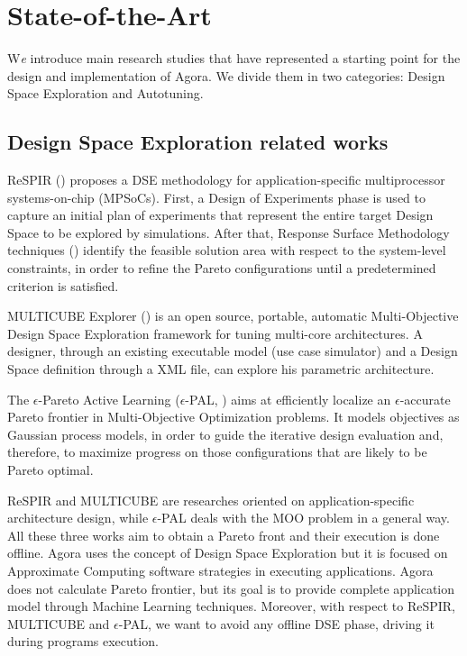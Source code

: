 \chapter{State-of-the-Art}\label{sota}

\lettrine{W}{}\textit{e} introduce main research studies that have represented a starting point for the design and implementation of A\-go\-ra. We divide them in two categories: Design Space Exploration and Autotuning.

\section{Design Space Exploration related works}

ReSPIR (\cite{palermo2009respir}) proposes a DSE methodology for application-spe\-cif\-ic multiprocessor systems-on-chip (MPSoCs). First, a Design of Experiments phase is used to capture an initial plan of experiments that represent the entire target Design Space to be explored by simulations. After that, Response Surface Methodology techniques (\cite{khuri2010response}) identify the feasible solution area with respect to the system-level constraints, in order to refine the Pareto configurations until a predetermined criterion is satisfied.

MULTICUBE Explorer (\cite{silvano2011multicube}) is an open source, portable, automatic Multi-Objective Design Space Exploration framework for tuning multi-core architectures. A designer, through an existing executable model (use case simulator) and a Design Space definition through a XML file, can explore his parametric architecture.

The $\epsilon$-Pareto Active Learning ($\epsilon$-PAL, \cite{zuluaga2016e}) aims at efficiently localize an $\epsilon$-accurate Pareto frontier in Multi-Objective Optimization problems. It models objectives as Gaussian process models, in order to guide the iterative design evaluation and, therefore, to maximize progress on those configurations that are likely to be Pareto optimal.

ReSPIR and MULTICUBE are researches oriented on ap\-pli\-ca\-tion-specific architecture design, while $\epsilon$-PAL deals with the MOO problem in a general way. All these three works aim to obtain a Pareto front and their execution is done offline. Agora uses the concept of Design Space Exploration but it is focused on Approximate Computing software strategies in executing applications. Agora does not calculate Pareto frontier, but its goal is to provide complete application model through Machine Learning techniques. Moreover, with respect to ReSPIR, MULTICUBE and $\epsilon$-PAL, we want to avoid any offline DSE phase, driving it during programs execution.


